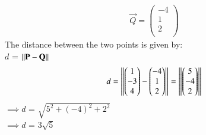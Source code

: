 \begin{equation}
\begin{aligned}
      \vec{Q} = \begin{pmatrix}
      -4\\ 
      1\\
      2\\
  
    \end{pmatrix}
\end{aligned}
\end{equation}
The distance between the two points is given by:\\
$d$ = $\left\lVert\mathbf{P} - \mathbf{Q}\right\rVert$\\
\begin{equation}
\begin{aligned}
      d = \left\lVert\begin{pmatrix}
      1\\ 
      -3\\
      4\\
  
    \end{pmatrix} - \begin{pmatrix}
      -4\\ 
      1\\
      2\\
  
    \end{pmatrix}\right\rVert = \left\lVert\begin{pmatrix}
      5\\ 
      -4\\
      2\\
  
    \end{pmatrix}\right\rVert
\end{aligned}
\end{equation}
$\implies d$ = $\sqrt{5^2 + (-4)^2 + 2^2}$\\
$\implies d$ = 3$\sqrt{5}$